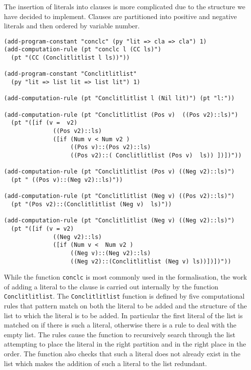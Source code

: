 The insertion of literals into clauses is more complicated due to the structure we have decided to implement. Clauses are partitioned into positive and negative literals and then ordered by variable number.


\begin{lstlisting}[caption =  "Functions for the insertion of a literal into a clause"]
(add-program-constant "conclc" (py "lit => cla => cla") 1)
(add-computation-rule (pt "conclc l (CC ls)") 
  (pt "(CC (Conclitlitlist l ls))"))

(add-program-constant "Conclitlitlist" 
  (py "lit => list lit => list lit") 1)

(add-computation-rule (pt "Conclitlitlist l (Nil lit)") (pt "l:"))

(add-computation-rule (pt "Conclitlitlist (Pos v)  ((Pos v2)::ls)")
  (pt "([if (v =  v2)                                                                                                       
              ((Pos v2)::ls)                                                                                       
              ([if (Num v < Num v2 )                                                                               
                   ((Pos v)::(Pos v2)::ls)                                                                         
                   ((Pos v2)::( Conclitlitlist (Pos v)  ls)) ])])"))

(add-computation-rule (pt "Conclitlitlist (Pos v) ((Neg v2)::ls)")
  (pt " ((Pos v)::(Neg v2)::ls)"))

(add-computation-rule (pt "Conclitlitlist (Neg v) ((Pos v2)::ls)")
  (pt "(Pos v2)::(Conclitlitlist (Neg v)  ls)"))

(add-computation-rule (pt "Conclitlitlist (Neg v) ((Neg v2)::ls)")
  (pt "([if (v = v2)                                                                                                        
              ((Neg v2)::ls)                                                                                      
              ([if (Num v <  Num v2 )                                                                              
                   ((Neg v)::(Neg v2)::ls)                                                                        
                   ((Neg v2)::(Conclitlitlist (Neg v) ls))])])"))
\end{lstlisting}

While the function \texttt{conclc}  is most commonly used in the formalisation, the work of adding a literal to the clause is carried out internally by the function \texttt{Conclitlitlist}. The \texttt{\justify Conclitlitlist} function is defined by five computational rules that pattern match on both the literal to be added and the structure of the list to which the literal is to be added. In particular the first literal of the list is matched on if there is such a literal, otherwise there is a rule to deal with the empty list. The rules cause the function to recursively search through the list attempting to place the literal in the right partition and in the right place in the order. The function also checks that such a literal does not already exist in the list which makes the addition of such a literal to the list redundant.

